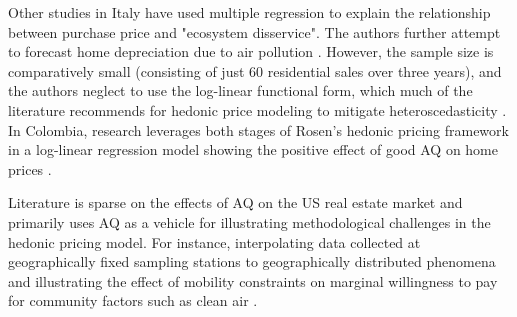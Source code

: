 \documentclass[sigconf,nonacm,11pt]{acmart}
\begin{document}

Other studies in Italy have used multiple regression to explain the relationship between purchase price and "ecosystem disservice". The authors further attempt to forecast home depreciation due to air pollution \cite{Nestico2020}. However, the sample size is comparatively small (consisting of just 60 residential sales over three years), and the authors neglect to use the log-linear functional form, which much of the literature recommends for hedonic price modeling to mitigate heteroscedasticity \cite{Morano2019} \cite{Fletcher2000} \cite{Cassel1985}. In Colombia, research leverages both stages of Rosen's hedonic pricing framework %
\cite{Rosen1974} in a log-linear regression model showing the positive effect of good AQ on home prices \cite{Carriazo2018}.

Literature is sparse on the effects of AQ on the US real estate market and primarily uses AQ as a vehicle for illustrating methodological challenges in the hedonic pricing model. For instance, interpolating data collected at geographically fixed sampling stations to geographically distributed phenomena \cite{Anselin2006} and illustrating the effect of mobility constraints on marginal willingness to pay for community factors such as clean air \cite{Bayer2009}.
\end{document}
